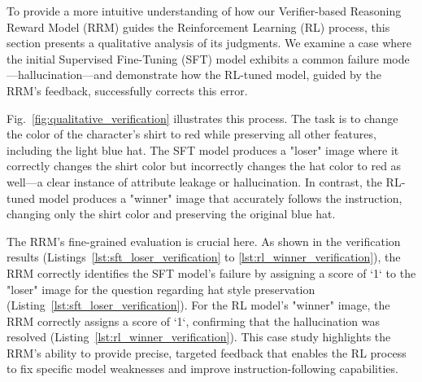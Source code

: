 To provide a more intuitive understanding of how our Verifier-based Reasoning Reward Model (RRM) guides the Reinforcement Learning (RL) process, this section presents a qualitative analysis of its judgments. We examine a case where the initial Supervised Fine-Tuning (SFT) model exhibits a common failure mode—hallucination—and demonstrate how the RL-tuned model, guided by the RRM's feedback, successfully corrects this error.

Fig.~\ref{fig:qualitative_verification} illustrates this process. The task is to change the color of the character's shirt to red while preserving all other features, including the light blue hat. The SFT model produces a "loser" image where it correctly changes the shirt color but incorrectly changes the hat color to red as well—a clear instance of attribute leakage or hallucination. In contrast, the RL-tuned model produces a "winner" image that accurately follows the instruction, changing only the shirt color and preserving the original blue hat.

The RRM's fine-grained evaluation is crucial here. As shown in the verification results (Listings~\ref{lst:sft_loser_verification} to \ref{lst:rl_winner_verification}), the RRM correctly identifies the SFT model's failure by assigning a score of `1` to the "loser" image for the question regarding hat style preservation (Listing~\ref{lst:sft_loser_verification}). For the RL model's "winner" image, the RRM correctly assigns a score of `1`, confirming that the hallucination was resolved (Listing~\ref{lst:rl_winner_verification}). This case study highlights the RRM's ability to provide precise, targeted feedback that enables the RL process to fix specific model weaknesses and improve instruction-following capabilities.


